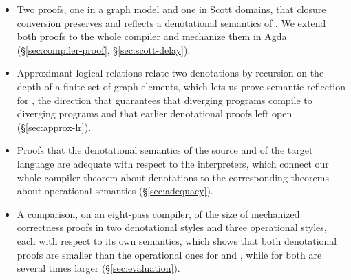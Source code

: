 
\begin{itemize}
\item Two proofs, one in a graph model and one in Scott domains, that
  closure conversion preserves and reflects a denotational semantics
  of \fpc. We extend both proofs to the whole compiler and mechanize
  them in Agda (\S\ref{sec:compiler-proof},
  \S\ref{sec:scott-delay}).
\item Approximant logical relations relate two denotations by
  recursion on the depth of a finite set of graph elements, which lets
  us prove semantic reflection for , the
  direction that guarantees that diverging programs
  compile to diverging programs and that earlier denotational proofs
  left open (\S\ref{sec:approx-lr}).
\item Proofs that the denotational semantics of the source and of the
  target language are adequate with respect to the interpreters,
  which connect our whole-compiler theorem about denotations to the
  corresponding theorems about operational semantics
  (\S\ref{sec:adequacy}).
\item A comparison, on an eight-pass compiler, of the size of mechanized
  correctness proofs in two denotational styles and three operational
  styles, each with respect to its own semantics, which shows that both denotational
  proofs are
  smaller than the operational ones for  and
  , while for  both are several times
  larger (\S\ref{sec:evaluation}).
\end{itemize}

